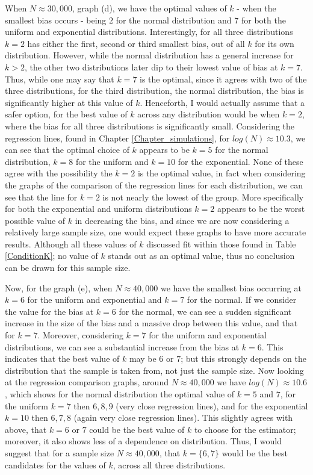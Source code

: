 \documentclass[12pt]{report}
\begin{document}
When $N \approx 30,000$, graph (d), we have the optimal values of $k$ - when the smallest bias occurs - being $2$ for the normal distribution and $7$ for both the uniform and exponential distributions. Interestingly, for all three distributions $k=2$ has either the first, second or third smallest bias, out of all $k$ for its own distribution. However, while the normal distribution has a general increase for $k > 2$, the other two distributions later dip to their lowest value of bias at $k=7$. Thus, while one may say that $k=7$ is the optimal, since it agrees with two of the three distributions, for the third distribution, the normal distribution, the bias is significantly higher at this value of $k$. Henceforth, I would actually assume that a safer option, for the best value of $k$ across any distribution would be when $k=2$, where the bias for all three distributions is significantly small. Considering the regression lines, found in Chapter \ref{Chapter_simulations}, for $log(N) \approx 10.3$, we can see that the optimal choice of $k$ appears to be $k=5$ for the normal distribution, $k=8$ for the uniform and $k=10$ for the exponential. None of these agree with the possibility the $k=2$ is the optimal value, in fact when considering the graphs of the comparison of the regression lines for each distribution, we can see that the line for $k=2$ is not nearly the lowest of the group. More specifically for both the exponential and uniform distributions $k=2$ appears to be the worst possible value of $k$ in decreasing the bias, and since we are now considering a relatively large sample size, one would expect these graphs to have more accurate results. Although all these values of $k$ discussed fit within those found in Table \ref{ConditionK}; no value of $k$ stands out as an optimal value, thus no conclusion can be drawn for this sample size.


Now, for the graph (e), when $N \approx 40,000$ we have the smallest bias occurring at $k=6$ for the uniform and exponential and $k=7$ for the normal. If we consider the value for the bias at $k=6$ for the normal, we can see a sudden significant increase in the size of the bias and a massive drop between this value, and that for $k=7$. Moreover, considering $k=7$ for the uniform and exponential distributions, we can see a substantial increase from the bias at $k=6$. This indicates that the best value of $k$ may be $6$ or $7$; but this strongly depends on the distribution that the sample is taken from, not just the sample size. Now looking at the regression comparison graphs, around $N \approx 40,000$ we have $log(N) \approx 10.6$, which shows for the normal distribution the optimal value of $k=5$ and $7$, for the uniform $k=7$ then $6, 8, 9$ (very close regression lines), and for the exponential $k=10$ then $6, 7, 8$ (again very close regression lines). This slightly agrees with above, that $k=6$ or $7$ could be the best value of $k$ to choose for the estimator; moreover, it also shows less of a dependence on distribution. Thus, I would suggest that for a sample size $N \approx 40,000$, that $k= \{6, 7\}$ would be the best candidates for the values of $k$, across all three distributions.
\end{document}
